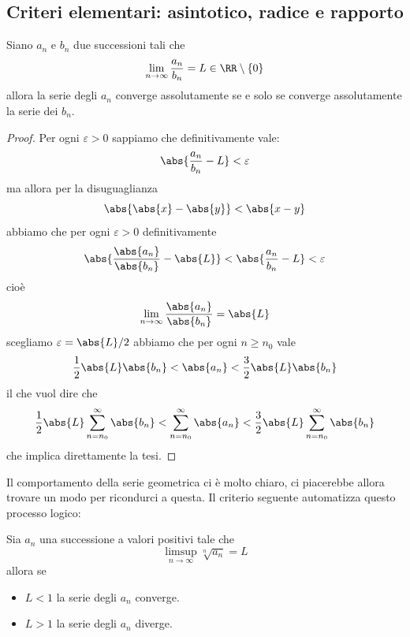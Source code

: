 \documentclass[11pt]{scrartcl}
\begin{document}
	
	\subsection{Criteri elementari: asintotico, radice e rapporto}
	\begin{theorem}
		Siano $a_n$ e $b_n$ due successioni tali che
		$$\lim_{n\to\infty}\frac{a_n}{b_n}=L\in \RR\setminus\left\{0\right\}$$
		allora la serie degli $a_n$ converge assolutamente se e solo se converge assolutamente la serie dei $b_n$.
	\end{theorem}
	\begin{proof} 
		Per ogni $\varepsilon>0$ sappiamo che definitivamente vale:
		$$\abs{\frac{a_n}{b_n}-L}<\varepsilon$$
		ma allora per la disuguaglianza
		$$\abs{\abs{x}-\abs{y}}<\abs{x-y}$$
		abbiamo che per ogni $\varepsilon>0$ definitivamente
		$$\abs{\frac{\abs{a_n}}{\abs{b_n}}-\abs{L}}<\abs{\frac{a_n}{b_n}-L}<\varepsilon$$
		cioè 
		$$\lim_{n\to\infty}\frac{\abs{a_n}}{\abs{b_n}}=\abs{L}$$
		scegliamo $\varepsilon=\abs{L}/2$ abbiamo che per ogni $n\ge n_0$ vale
		$$\frac{1}{2}\abs{L}\abs{b_n}<\abs{a_n}<\frac{3}{2}\abs{L}\abs{b_n}$$
		il che vuol dire che 
		$$\frac{1}{2}\abs{L}\sum_{n=n_0}^{\infty}\abs{b_n}<\sum_{n=n_0}^{\infty}\abs{a_n}<\frac{3}{2}\abs{L}\sum_{n=n_0}^{\infty}\abs{b_n}$$
		che implica direttamente la tesi.
	\end{proof}
	Il comportamento della serie geometrica ci è molto chiaro, ci piacerebbe allora trovare un modo per ricondurci a questa. Il criterio seguente automatizza questo processo logico:
	\begin{theorem}
		Sia $a_n$ una successione a valori positivi tale che 
		$$\limsup_{n\to\infty}\sqrt[n]{a_n}=L$$
		allora se
		\begin{itemize}
			\item $L<1$ la serie degli $a_n$ converge.
			\item $L>1$ la serie degli $a_n$ diverge.
		\end{itemize}
	\end{theorem}
\end{document}
